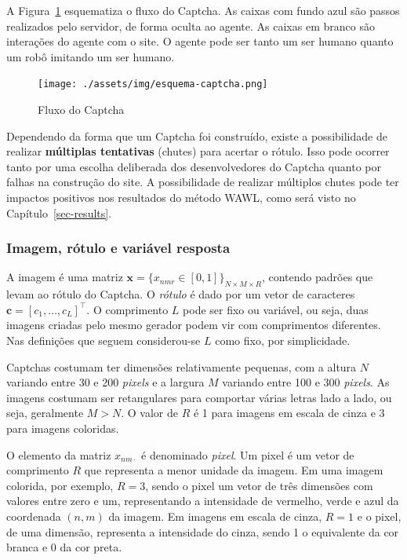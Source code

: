 \documentclass[12pt,twoside,brazilian]{book}
\begin{document}
A Figura~\ref{fig-esquema-captcha} esquematiza o fluxo do Captcha. As
caixas com fundo azul são passos realizados pelo servidor, de forma
oculta ao agente. As caixas em branco são interações do agente com o
site. O agente pode ser tanto um ser humano quanto um robô imitando um
ser humano.

\begin{figure}

{\centering \texttt{[image: ./assets/img/esquema-captcha.png]}

}

\caption{\label{fig-esquema-captcha}Fluxo do Captcha}

\end{figure}

Dependendo da forma que um Captcha foi construído, existe a
possibilidade de realizar \textbf{múltiplas tentativas} (chutes) para
acertar o rótulo. Isso pode ocorrer tanto por uma escolha deliberada dos
desenvolvedores do Captcha quanto por falhas na construção do site. A
possibilidade de realizar múltiplos chutes pode ter impactos positivos
nos resultados do método WAWL, como será visto no
Capítulo~\ref{sec-results}.

\hypertarget{imagem-ruxf3tulo-e-variuxe1vel-resposta}{%
\subsubsection{Imagem, rótulo e variável
resposta}\label{imagem-ruxf3tulo-e-variuxe1vel-resposta}}

A imagem é uma matriz
\(\mathbf x = \{x_{nmr} \in [0,1]\}_{N\times M \times R}\), contendo
padrões que levam ao rótulo do Captcha. O \emph{rótulo} é dado por um
vetor de caracteres \(\mathbf c = [c_1,\dots,c_L]^\top\). O comprimento
\(L\) pode ser fixo ou variável, ou seja, duas imagens criadas pelo
mesmo gerador podem vir com comprimentos diferentes. Nas definições que
seguem considerou-se \(L\) como fixo, por simplicidade.

Captchas costumam ter dimensões relativamente pequenas, com a altura
\(N\) variando entre 30 e 200 \emph{pixels} e a largura \(M\) variando
entre 100 e 300 \emph{pixels}. As imagens costumam ser retangulares para
comportar várias letras lado a lado, ou seja, geralmente \(M > N\). O
valor de \(R\) é 1 para imagens em escala de cinza e 3 para imagens
coloridas.

O elemento da matriz \(x_{nm\cdot}\) é denominado \emph{pixel}. Um pixel
é um vetor de comprimento \(R\) que representa a menor unidade da
imagem. Em uma imagem colorida, por exemplo, \(R=3\), sendo o pixel um
vetor de três dimensões com valores entre zero e um, representando a
intensidade de vermelho, verde e azul da coordenada \((n, m)\) da
imagem. Em imagens em escala de cinza, \(R=1\) e o pixel, de uma
dimensão, representa a intensidade do cinza, sendo 1 o equivalente da
cor branca e 0 da cor preta.
\end{document}
